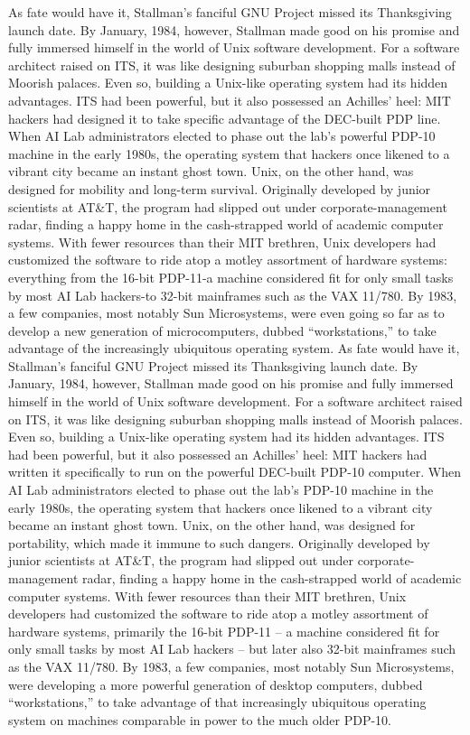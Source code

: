 \ifdefined\eng
\ifdefined\vone
As fate would have it, Stallman's fanciful GNU Project missed its Thanksgiving launch date. By January, 1984, however, Stallman made good on his promise and fully immersed himself in the world of Unix software development. For a software architect raised on ITS, it was like designing suburban shopping malls instead of Moorish palaces. Even so, building a Unix-like operating system had its hidden advantages. ITS had been powerful, but it also possessed an Achilles' heel: MIT hackers had designed it to take specific advantage of the DEC-built PDP line. When AI Lab administrators elected to phase out the lab's powerful PDP-10 machine in the early 1980s, the operating system that hackers once likened to a vibrant city became an instant ghost town. Unix, on the other hand, was designed for mobility and long-term survival. Originally developed by junior scientists at AT\&T, the program had slipped out under corporate-management radar, finding a happy home in the cash-strapped world of academic computer systems. With fewer resources than their MIT brethren, Unix developers had customized the software to ride atop a motley assortment of hardware systems: everything from the 16-bit PDP-11-a machine considered fit for only small tasks by most AI Lab hackers-to 32-bit mainframes such as the VAX 11/780. By 1983, a few companies, most notably Sun Microsystems, were even going so far as to develop a new generation of microcomputers, dubbed ``workstations,'' to take advantage of the increasingly ubiquitous operating system.
\fi
\ifdefined\vtwo
As fate would have it, Stallman's fanciful GNU Project missed its Thanksgiving launch date. By January, 1984, however, Stallman made good on his promise and fully immersed himself in the world of Unix software development. For a software architect raised on ITS, it was like designing suburban shopping malls instead of Moorish palaces. Even so, building a Unix-like operating system had its hidden advantages. ITS had been powerful, but it also possessed an Achilles' heel: MIT hackers had written it specifically to run on the powerful DEC-built PDP-10 computer. When AI Lab administrators elected to phase out the lab's PDP-10 machine in the early 1980s, the operating system that hackers once likened to a vibrant city became an instant ghost town. Unix, on the other hand, was designed for portability, which made it immune to such dangers. Originally developed by junior scientists at AT\&T, the program had slipped out under corporate-management radar, finding a happy home in the cash-strapped world of academic computer systems. With fewer resources than their MIT brethren, Unix developers had customized the software to ride atop a motley assortment of hardware systems, primarily the 16-bit PDP-11 -- a machine considered fit for only small tasks by most AI Lab hackers -- but later also 32-bit mainframes such as the VAX 11/780. By 1983, a few companies, most notably Sun Microsystems, were developing a more powerful generation of desktop computers, dubbed ``workstations,'' to take advantage of that increasingly ubiquitous operating system on machines comparable in power to the much older PDP-10.
\fi
\fi

